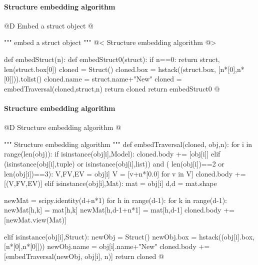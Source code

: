 \documentclass[11pt,oneside]{article}    %
\begin{document}
\paragraph{Structure embedding algorithm}
@D Embed a struct object
@{""" embed a struct object """
@< Structure embedding algorithm  @>

def embedStruct(n):
    def embedStruct0(struct):
        if n==0: 
            return struct, len(struct.box[0])
        cloned = Struct()
        cloned.box = hstack((struct.box, [n*[0],n*[0]])).tolist()
        cloned.name = struct.name+"New"
        cloned = embedTraversal(cloned,struct,n) 
        return cloned
    return embedStruct0
@}

\paragraph{Structure embedding algorithm}
@D Structure embedding algorithm 
@{""" Structure embedding algorithm """
def embedTraversal(cloned, obj,n):
    for i in range(len(obj)):
        if isinstance(obj[i],Model): 
            cloned.body += [obj[i]]
        elif (isinstance(obj[i],tuple) or isinstance(obj[i],list)) and (
                len(obj[i])==2 or len(obj[i])==3):
            V,FV,EV = obj[i]
            V = [v+n*[0.0] for v in V]
            cloned.body  += [(V,FV,EV)]
        elif isinstance(obj[i],Mat): 
            mat = obj[i]
            d,d = mat.shape

            newMat = scipy.identity(d+n*1)
            for h in range(d-1): 
                for k in range(d-1): 
                    newMat[h,k] = mat[h,k]
                newMat[h,d-1+n*1] = mat[h,d-1]
            cloned.body  +=  [newMat.view(Mat)]

        elif isinstance(obj[i],Struct):
            newObj = Struct()
            newObj.box = hstack((obj[i].box, [n*[0],n*[0]]))
            newObj.name = obj[i].name+"New"
            cloned.body  += [embedTraversal(newObj, obj[i], n)]
    return cloned
@}

\end{document}
